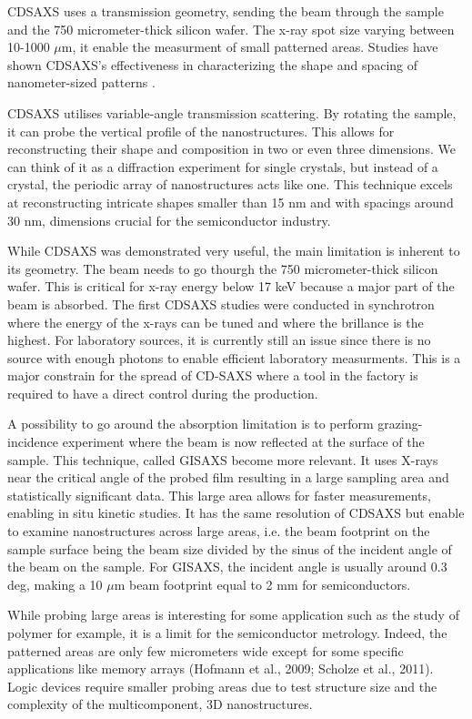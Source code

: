 CDSAXS uses a transmission geometry, sending the beam through the sample and the 750 micrometer-thick silicon wafer. The x-ray spot size varying between 10-1000 $\mu$m, it enable the measurment of small patterned areas. 
Studies have shown CDSAXS's effectiveness in characterizing the shape and spacing of nanometer-sized patterns \cite{sunday_2015}.

\medskip
CDSAXS  utilises variable-angle transmission scattering. By rotating the sample, it can probe the vertical profile of the nanostructures. This allows 
for reconstructing their shape and composition in two or even three dimensions.
We can think of it as a diffraction experiment for single crystals, but instead of a crystal, the 
periodic array of nanostructures acts like one. This technique excels at reconstructing 
intricate shapes smaller than 15 nm and with spacings around 30 nm, dimensions crucial for 
the semiconductor industry. \cite{first_cdsaxs_article}

\medskip
While CDSAXS was demonstrated very useful, the main limitation is inherent to its geometry. The beam needs to go thourgh the 750 micrometer-thick silicon wafer.
This is critical for x-ray energy below 17 keV because a major part of the beam is absorbed. The first CDSAXS studies were conducted in synchrotron where the energy
of the x-rays can be tuned and where the brillance is the highest. For laboratory sources, it is currently still an issue since there is no source with enough photons to enable
efficient laboratory measurments. This is a major constrain for the spread of CD-SAXS where a tool in the factory is required to have a direct control during the production. 

\medskip
A possibility to go around the absorption limitation is to perform grazing-incidence experiment where the beam is now reflected at the surface of the sample. This technique, 
called GISAXS become more relevant. It uses X-rays near the critical angle of the probed film resulting in a large sampling area and statistically significant data. This large area allows for faster measurements, enabling in situ kinetic studies.
It has the same resolution of CDSAXS but enable to examine nanostructures across large areas, i.e. the beam footprint on the sample surface 
being the beam size divided by the sinus of the incident angle of the beam on the sample. For GISAXS, the incident angle is usually around 0.3 deg, making a 10 $\mu$m beam footprint equal to 2 mm   
for semiconductors. 

While probing large areas is interesting for some application such as the study of polymer for example, it is a limit for 
the semiconductor metrology. Indeed, the patterned areas are only few micrometers wide except for some specific applications like memory arrays (Hofmann et al.,
2009; Scholze et al., 2011). Logic devices require smaller probing areas due to test structure 
size and the complexity of the multicomponent, 3D nanostructures. \cite{phd_freychet}

